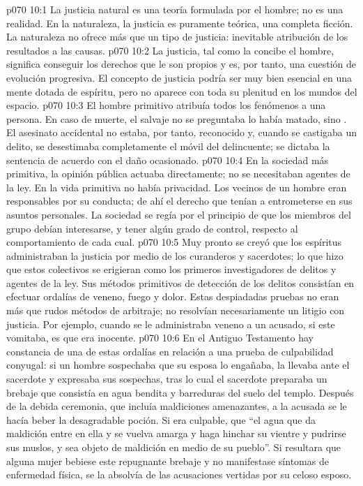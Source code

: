 \vs p070 10:1 La justicia natural es una teoría formulada por el hombre; no es una realidad. En la naturaleza, la justicia es puramente teórica, una completa ficción. La naturaleza no ofrece más que un tipo de justicia: inevitable atribución de los resultados a las causas.
\vs p070 10:2 La justicia, tal como la concibe el hombre, significa conseguir los derechos que le son propios y es, por tanto, una cuestión de evolución progresiva. El concepto de justicia podría ser muy bien esencial en una mente dotada de espíritu, pero no aparece con toda su plenitud en los mundos del espacio.
\vs p070 10:3 El hombre primitivo atribuía todos los fenómenos a una persona. En caso de muerte, el salvaje no se preguntaba  lo había matado, sino . El asesinato accidental no estaba, por tanto, reconocido y, cuando se castigaba un delito, se desestimaba completamente el móvil del delincuente; se dictaba la sentencia de acuerdo con el daño ocasionado.
\vs p070 10:4 \pc En la sociedad más primitiva, la opinión pública actuaba directamente; no se necesitaban agentes de la ley. En la vida primitiva no había privacidad. Los vecinos de un hombre eran responsables por su conducta; de ahí el derecho que tenían a entrometerse en sus asuntos personales. La sociedad se regía por el principio de que los miembros del grupo debían interesarse, y tener algún grado de control, respecto al comportamiento de cada cual.
\vs p070 10:5 Muy pronto se creyó que los espíritus administraban la justicia por medio de los curanderos y sacerdotes; lo que hizo que estos colectivos se erigieran como los primeros investigadores de delitos y agentes de la ley. Sus métodos primitivos de detección de los delitos consistían en efectuar ordalías de veneno, fuego y dolor. Estas despiadadas pruebas no eran más que rudos métodos de arbitraje; no resolvían necesariamente un litigio con justicia. Por ejemplo, cuando se le administraba veneno a un acusado, si este vomitaba, es que era inocente.
\vs p070 10:6 En el Antiguo Testamento hay constancia de una de estas ordalías en relación a una prueba de culpabilidad conyugal: si un hombre sospechaba que su esposa lo engañaba, la llevaba ante el sacerdote y expresaba sus sospechas, tras lo cual el sacerdote preparaba un brebaje que consistía en agua bendita y barreduras del suelo del templo. Después de la debida ceremonia, que incluía maldiciones amenazantes, a la acusada se le hacía beber la desagradable poción. Si era culpable, que “el agua que da maldición entre en ella y se vuelva amarga y haga hinchar su vientre y pudrirse sus muslos, y sea objeto de maldición en medio de su pueblo”. Si resultara que alguna mujer bebiese este repugnante brebaje y no manifestase síntomas de enfermedad física, se la absolvía de las acusaciones vertidas por su celoso esposo.
